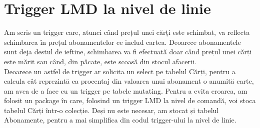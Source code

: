 \documentclass[12pt]{article}
\begin{document}
\section{Trigger LMD la nivel de linie}
Am scris un trigger care, atunci când prețul unei cărți este schimbat, va reflecta schimbarea în prețul abonamentelor ce includ cartea. Deoarece abonamentele sunt deja destul de ieftine, schimbarea va fi efectuată doar când prețul unei cărți este mărit sau când, din păcate, este scoasă din stocul afacerii.\\
Deoarece un astfel de trigger ar solicita un select pe tabelul Cărți, pentru a calcula cât reprezintă ca procentaj din valoarea unui abonament o anumită carte, am avea de a face cu un trigger pe tabele mutating. Pentru a evita eroarea, am folosit un package în care, folosind un trigger LMD la nivel de comandă, voi stoca tabelul Cărți într-o colecție. Deși nu este necesar, am stocat și tabelul Abonamente, pentru a mai simplifica din codul trigger-ului la nivel de linie.\\
\end{document}
